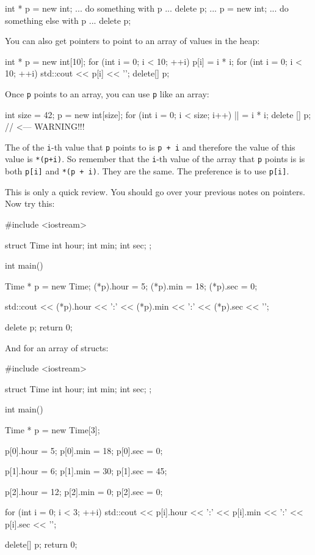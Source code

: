 \begin{consolethree}[escapeinside=||]
int * p = new int;
... do something with p ...
delete p;
...
p = new int;
... do something else with p ...
delete p;
\end{consolethree}

You can also get pointers to point to an array of values in the heap:

\begin{consolethree}[escapeinside=||]
int * p = new int[10];
for (int i = 0; i < 10; ++i)
{
    p[i] = i * i;
}
for (int i = 0; i < 10; ++i)
{
    std::cout << p[i] << '\n';
}
delete[] p;
\end{consolethree}

Once \texttt{p} points to an array, you can use \texttt{p} like an array:

\begin{consolethree}[escapeinside=||]
int size = 42;
p = new int[size];
for (int i = 0; i < size; i++)
{
    || = i * i;
}
delete [] p; // <--- WARNING!!!
\end{consolethree}

The  of the \texttt{i}-th value that \texttt{p} points to is \verb!p + i! and
therefore the value of this value is \verb!*(p+i)!. So remember that the \texttt{i}-th
value of the array that \texttt{p} points is is both \verb!p[i]! and \verb!*(p + i)!. They are
the same. The preference is to use \verb!p[i]!.

This is only a quick review. You should go over your previous notes on
pointers. Now try this:

\begin{consolethree}[escapeinside=||]
#include <iostream>

struct Time
{
    int hour;
    int min;
    int sec;
};

int main()
{
    Time * p = new Time;
    (*p).hour = 5;
    (*p).min = 18;
    (*p).sec = 0;

    std::cout << (*p).hour << ':'
              << (*p).min << ':'
              << (*p).sec << '\n';

    delete p;
    return 0;
}
\end{consolethree}

And for an array of structs:

\begin{consolethree}[escapeinside=||]
#include <iostream>

struct Time
{
    int hour;
    int min;
    int sec;
};

int main()
{
    Time * p = new Time[3];

    p[0].hour = 5;
    p[0].min = 18;
    p[0].sec = 0;

    p[1].hour = 6;
    p[1].min = 30;
    p[1].sec = 45;

    p[2].hour = 12;
    p[2].min = 0;
    p[2].sec = 0;

    for (int i = 0; i < 3; ++i)
    {
        std::cout << p[i].hour << ':'
                  << p[i].min << ':'
                  << p[i].sec << '\n';
    }

    delete[] p;
    return 0;
}
\end{consolethree}

